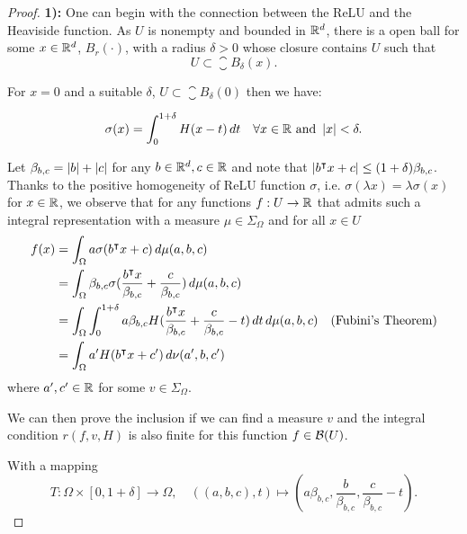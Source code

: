 \begin{proof}


\textbf{1):} 
One can begin with the connection between the ReLU and the Heaviside function.
As $U$ is nonempty and bounded in $\mathbb{R}^d$, there is a open ball for some $x \in
\mathbb{R}^d$, $B_r(\cdot)$, with a radius $\delta > 0$ whose closure contains $U$ such
that
\begin{equation}
    U \subset \closure{B_{\delta}(x)}.
\end{equation}

For $x=0$ and a suitable $\delta$, $U \subset \closure{B_{\delta}(0)}$ then we
have:

\begin{equation}
    \sigma(x) = \int_0^{1+\delta} H(x-t) \,dt 
    \quad \forall x \in \mathbb{R} \textnormal{ and } \left| x \right| < \delta.
\end{equation}

Let $\beta_{b,c} = \left| b \right| + \left| c \right|$ for any $b\in\mathbb{R}^d, c\in\mathbb{R}$ and note that
$\left| b{}^{\intercal} x + c \right| \leq (1+\delta)\beta_{b,c}$. Thanks to the positive
homogeneity of ReLU function $\sigma$, i.e. $\sigma(\lambda x) = \lambda
\sigma(x)$ for $x \in \mathbb{R}$, we observe that for any functions $f:U\to\mathbb{R}$ that
admits such a integral representation with a measure $\mu \in \Sigma_{\Omega}$
and for all $x \in U$
\begin{align*}
    f(x) 
    &= \int_{\Omega} a \sigma(b{}^{\intercal} x + c )\,d\mu(a,b,c) \\
    &= \int_{\Omega} \beta_{b,c} \sigma(
        \frac{b{}^{\intercal} x}{\beta_{b,c}}+ \frac{c}{\beta_{b,c}}
    ) \,d\mu(a,b,c) \\
    &= \int_{\Omega} \int_0^{1+\delta} 
        a\beta_{b,c} H(\frac{b{}^{\intercal} x}{\beta_{b,c}} +
        \frac{c}{\beta_{b,c}} -t)\,dt\,d\mu(a,b,c) \quad
        \text{(Fubini's Theorem)} \\
    &= \int_{\Omega} a' H(b{}^{\intercal} x + c') \,d\nu(a',b,c')
\end{align*}
where $a', c' \in \mathbb{R}$ for some $v \in \Sigma_{\Omega}$.

We can then prove the inclusion if we can find a measure $v$ and the integral
condition $r(f, v, H)$ is also finite for this function $f \in \mathcal{B}(U)$.

With a mapping
\begin{equation}
    T: \Omega \times [0,1+\delta] \to \Omega, \quad 
    ((a,b,c), t) \mapsto
    (a\beta_{b,c}, \frac{b}{\beta_{b,c}}, \frac{c}{\beta_{b,c}} - t).
\end{equation}


\end{proof}
